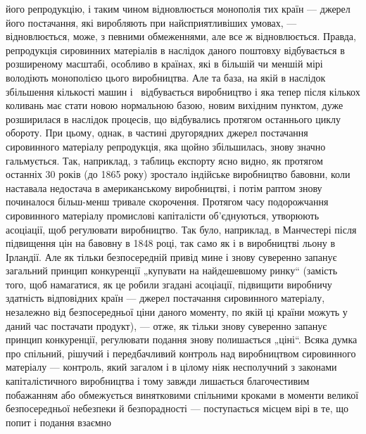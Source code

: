 \parcont{}  %
його репродукцію, і таким чином відновлюється монополія тих
країн — джерел його постачання, які виробляють при найсприятливіших
умовах, — відновлюється, може, з певними обмеженнями,
але все ж відновлюється. Правда, репродукція сировинних
матеріалів в наслідок даного поштовху відбувається в розширеному
масштабі, особливо в країнах, які в більшій чи меншій мірі
володіють монополією цього виробництва. Але та база, на якій в наслідок
збільшення кількості машин і~ відбувається виробництво
і яка тепер після кількох коливань має стати новою нормальною
базою, новим вихідним пунктом, дуже розширилася в наслідок
процесів, що відбувались протягом останнього циклу обороту.
При цьому, однак, в частині другорядних джерел постачання
сировинного матеріалу репродукція, яка щойно збільшилась, знову
значно гальмується. Так, наприклад, з таблиць експорту ясно
видно, як протягом останніх 30 років (до 1865 року) зростало
індійське виробництво бавовни, коли наставала недостача в американському
виробництві, і потім раптом знову починалося
більш-менш тривале скорочення. Протягом часу подорожчання
сировинного матеріалу промислові капіталісти об’єднуються,
утворюють асоціації, щоб регулювати виробництво. Так було,
наприклад, в Манчестері після підвищення цін на бавовну в
1848 році, так само як і в виробництві льону в Ірландії. Але як
тільки безпосередній привід мине і знову суверенно запанує загальний
принцип конкуренції „купувати на найдешевшому ринку“
(замість того, щоб намагатися, як це робили згадані асоціації,
підвищити виробничу здатність відповідних країн — джерел постачання
сировинного матеріалу, незалежно від безпосередньої
ціни даного моменту, по якій ці країни можуть у даний час постачати
продукт), — отже, як тільки знову суверенно запанує
принцип конкуренції, регулювати подання знову полишається
„ціні“. Всяка думка про спільний, рішучий і передбачливий контроль
над виробництвом сировинного матеріалу — контроль,
який загалом і в цілому ніяк несполучний з законами капіталістичного
виробництва і тому завжди лишається благочестивим
побажанням або обмежується винятковими спільними кроками
в моменти великої безпосередньої небезпеки й безпорадності —
поступається місцем вірі в те, що попит і подання взаємно
